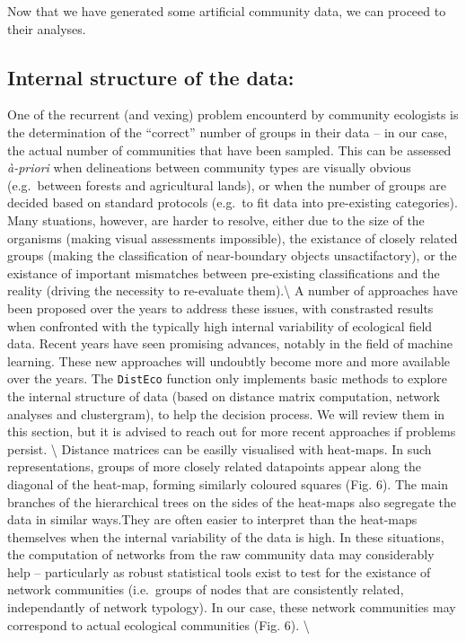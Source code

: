 \documentclass[
]{article}
\begin{document}
Now that we have generated some artificial community data, we can
proceed to their analyses.

\hypertarget{internal-structure-of-the-data}{%
\subsection{Internal structure of the
data:}\label{internal-structure-of-the-data}}

One of the recurrent (and vexing) problem encounterd by community
ecologists is the determination of the ``correct'' number of groups in
their data -- in our case, the actual number of communities that have
been sampled. This can be assessed \emph{à-priori} when delineations
between community types are visually obvious (e.g.~between forests and
agricultural lands), or when the number of groups are decided based on
standard protocols (e.g.~to fit data into pre-existing categories). Many
stuations, however, are harder to resolve, either due to the size of the
organisms (making visual assessments impossible), the existance of
closely related groups (making the classification of near-boundary
objects unsactifactory), or the existance of important mismatches
between pre-existing classifications and the reality (driving the
necessity to re-evaluate them).\textbackslash{} A number of approaches
have been proposed over the years to address these issues, with
constrasted results when confronted with the typically high internal
variability of ecological field data. Recent years have seen promising
advances, notably in the field of machine learning. These new approaches
will undoubtly become more and more available over the years. The
\texttt{DistEco} function only implements basic methods to explore the
internal structure of data (based on distance matrix computation,
network analyses and clustergram), to help the decision process. We will
review them in this section, but it is advised to reach out for more
recent approaches if problems persist. \textbackslash{} Distance
matrices can be easilly visualised with heat-maps. In such
representations, groups of more closely related datapoints appear along
the diagonal of the heat-map, forming similarly coloured squares (Fig.
6). The main branches of the hierarchical trees on the sides of the
heat-maps also segregate the data in similar ways.They are often easier
to interpret than the heat-maps themselves when the internal variability
of the data is high. In these situations, the computation of networks
from the raw community data may considerably help -- particularly as
robust statistical tools exist to test for the existance of network
communities (i.e.~groups of nodes that are consistently related,
independantly of network typology). In our case, these network
communities may correspond to actual ecological communities (Fig. 6).
\textbackslash{}
\end{document}
